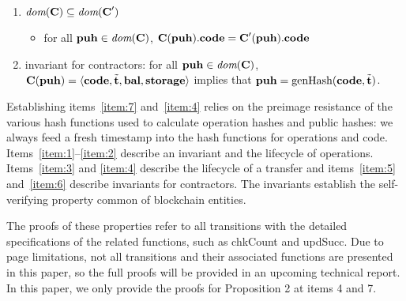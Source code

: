 \documentclass[runningheads]{llncs}
\begin{document}
\begin{proposition}
\begin{enumerate}
 \item\label{item:5} $ \textit{dom} (\textbf{C}) \subseteq \textit{dom} (\textbf{C}')$
   \begin{itemize}
   \item for all $\textbf{puh} \in \textit{dom} (\textbf{C})$,
     $\textbf{C} (\textbf{puh}).\textbf{code} = \textbf{C}' (\textbf{puh}).\textbf{code}$
   \end{itemize}
 \item\label{item:6} invariant for contractors:
   for all $\textbf{puh} \in \textit{dom} (\textbf{C})$,
   $\textbf{C} (\textbf{puh}) = \langle \textbf{code}, \tilde{\textbf{t}}, \textbf{bal}, \textbf{storage}\rangle$
   implies that $\textbf{puh} = \textup{genHash} (\textbf{code}, \tilde{\textbf{t}})$.
\end{enumerate}
\end{proposition}
Establishing items~\ref{item:7} and~\ref{item:4} relies on the preimage resistance of the
various hash functions used to calculate operation hashes and public
hashes: we always feed a fresh timestamp into the hash
functions for operations and code. Items~\ref{item:1}--\ref{item:2} describe an invariant and
the lifecycle of 
operations. Items~\ref{item:3} and \ref{item:4} describe the lifecycle
of a transfer and items~\ref{item:5} and~\ref{item:6} describe
invariants for contractors. The invariants establish the
self-verifying property common of blockchain entities.

The proofs of these properties refer to all transitions with the detailed specifications of the related functions, such as chkCount and updSucc. Due to page limitations, not all transitions and their associated functions are presented in this paper, so the full proofs will be provided in an upcoming technical report. In this paper, we only provide the proofs for Proposition 2 at items 4 and 7.  
\end{document}
